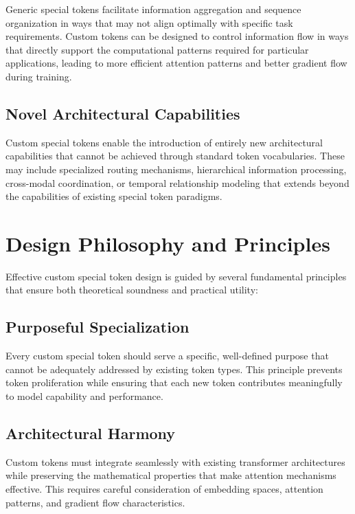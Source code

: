 Generic special tokens facilitate information aggregation and sequence organization in ways that may not align optimally with specific task requirements. Custom tokens can be designed to control information flow in ways that directly support the computational patterns required for particular applications, leading to more efficient attention patterns and better gradient flow during training.

\subsection{Novel Architectural Capabilities}

Custom special tokens enable the introduction of entirely new architectural capabilities that cannot be achieved through standard token vocabularies. These may include specialized routing mechanisms, hierarchical information processing, cross-modal coordination, or temporal relationship modeling that extends beyond the capabilities of existing special token paradigms.

\section{Design Philosophy and Principles}

Effective custom special token design is guided by several fundamental principles that ensure both theoretical soundness and practical utility:

\subsection{Purposeful Specialization}

Every custom special token should serve a specific, well-defined purpose that cannot be adequately addressed by existing token types. This principle prevents token proliferation while ensuring that each new token contributes meaningfully to model capability and performance.

\subsection{Architectural Harmony}

Custom tokens must integrate seamlessly with existing transformer architectures while preserving the mathematical properties that make attention mechanisms effective. This requires careful consideration of embedding spaces, attention patterns, and gradient flow characteristics.

